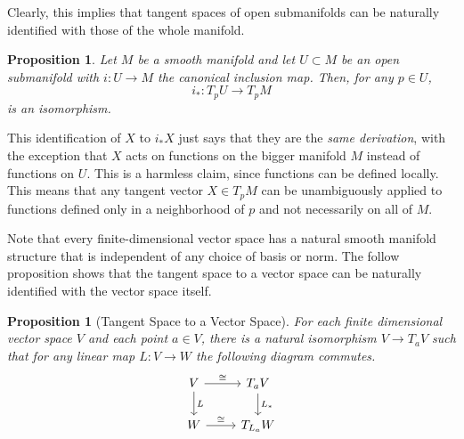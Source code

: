 \documentclass{article}
\newtheorem{proposition}[theorem]{Proposition}
\theoremstyle{remark}
\theoremstyle{definition}
\begin{document}
Clearly, this implies that tangent spaces of open submanifolds can be naturally identified with those of the whole manifold. 

\begin{proposition}
Let $M$ be a smooth manifold and let $U \subset M$ be an open submanifold with $i: U \longrightarrow M$ the canonical inclusion map. Then, for any $p \in U$, 
\[i_* : T_p U \longrightarrow T_p M\]
is an isomorphism. 
\end{proposition}

This identification of $X$ to $i_* X$ just says that they are the \textit{same derivation}, with the exception that $X$ acts on functions on the bigger manifold $M$ instead of functions on $U$. This is a harmless claim, since functions can be defined locally. This means that any tangent vector $X \in T_p M$ can be unambiguously applied to functions defined only in a neighborhood of $p$ and not necessarily on all of $M$. 

Note that every finite-dimensional vector space has a natural smooth manifold structure that is independent of any choice of basis or norm. The follow proposition shows that the tangent space to a vector space can be naturally identified with the vector space itself. 

\begin{proposition}[Tangent Space to a Vector Space]
For each finite dimensional vector space $V$ and each point $a \in V$, there is a natural isomorphism $V \rightarrow T_a V$ such that for any linear map $L: V \longrightarrow W$ the following diagram commutes. 
\[\begin{tikzcd}
    V \arrow{r}{\cong} \arrow{d}{L}& T_aV \arrow{d}{L_*} \\
    W \arrow{r}{\cong} & T_{L_a}W 
\end{tikzcd}\]
\end{proposition}
\end{document}
